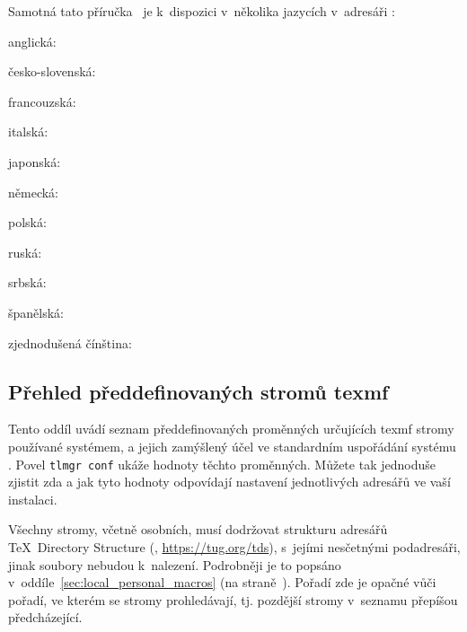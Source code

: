 \documentclass[\classoptions,slovak,english,czech]{\classname}
\def\p.{na straně~}
\begin{document}
Samotná tato příručka \TL\ je k~dispozici v~několika 
jazycích v~adresáři :
\begin{itemize*}
\item{anglická:} 
\item{česko-slovenská:} 
\item{francouzská:} 
\item{italská:} 
\item{japonská:} 
\item{německá:} 
\item{polská:} 
\item{ruská:} 
\item{srbská:} 
\item{španělská:} 
\item{zjednodušená čínština:} 
\end{itemize*}

\subsection{Přehled předdefinovaných stromů texmf}
\label{sec:texmftrees}

Tento oddíl uvádí seznam předdefinovaných proměnných určujících 
texmf stromy používané systémem, a jejich zamýšlený účel
ve standardním uspořádání systému \TL. 
Povel \texttt{tlmgr~conf} ukáže hodnoty těchto proměnných.
Můžete tak jednoduše zjistit zda a jak tyto hodnoty odpovídají
nastavení jednotlivých adresářů ve vaší instalaci.

Všechny stromy, včetně osobních, musí dodržovat strukturu adresářů \TeX\
Directory Structure (\TDS, \url{https://tug.org/tds}), s~jejími nesčetnými 
podadresáři, jinak soubory nebudou k~nalezení. Podrobněji je to 
popsáno v~oddíle~\ref{sec:local_personal_macros} 
(\p.\pageref{sec:local_personal_macros}).
Pořadí zde je opačné vůči pořadí, ve kterém se stromy 
prohledávají, tj. pozdější stromy v~seznamu přepíšou předcházející. 
\end{document}
